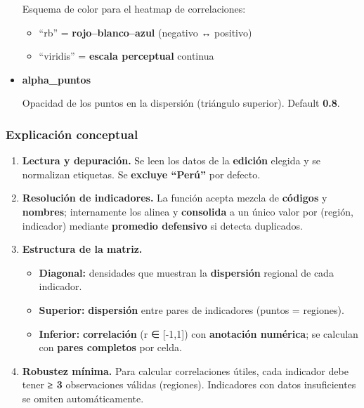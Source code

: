 \documentclass[
  11pt,
  letterpaper,
  DIV=11,
  numbers=noendperiod]{scrartcl}
\begin{document}
\begin{itemize}
  Esquema de color para el heatmap de correlaciones:

  \begin{itemize}
  \item
    ``rb'' = \textbf{rojo--blanco--azul} (negativo ↔ positivo)
  \item
    ``viridis'' = \textbf{escala perceptual} continua
  \end{itemize}
\item
  \textbf{alpha\_puntos}

  Opacidad de los puntos en la dispersión (triángulo superior). Default
  \textbf{0.8}.
\end{itemize}

\subsubsection{\texorpdfstring{\textbf{Explicación
conceptual}}{Explicación conceptual}}\label{explicaciuxf3n-conceptual-22}

\begin{enumerate}
\def\labelenumi{\arabic{enumi}.}
\item
  \textbf{Lectura y depuración.} Se leen los datos de la
  \textbf{edición} elegida y se normalizan etiquetas. Se \textbf{excluye
  ``Perú''} por defecto.
\item
  \textbf{Resolución de indicadores.} La función acepta mezcla de
  \textbf{códigos} y \textbf{nombres}; internamente los alinea y
  \textbf{consolida} a un único valor por (región, indicador) mediante
  \textbf{promedio defensivo} si detecta duplicados.
\item
  \textbf{Estructura de la matriz.}

  \begin{itemize}
  \item
    \textbf{Diagonal:} densidades que muestran la \textbf{dispersión}
    regional de cada indicador.
  \item
    \textbf{Superior:} \textbf{dispersión} entre pares de indicadores
    (puntos = regiones).
  \item
    \textbf{Inferior:} \textbf{correlación} (r ∈ {[}-1,1{]}) con
    \textbf{anotación numérica}; se calculan con \textbf{pares
    completos} por celda.
  \end{itemize}
\item
  \textbf{Robustez mínima.} Para calcular correlaciones útiles, cada
  indicador debe tener \textbf{≥ 3} observaciones válidas (regiones).
  Indicadores con datos insuficientes se omiten automáticamente.
\end{enumerate}
\end{document}
